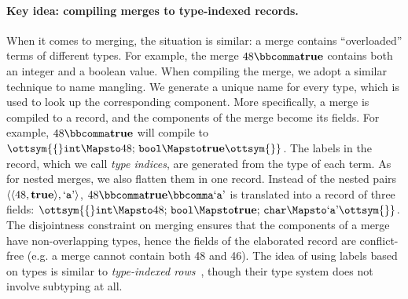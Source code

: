 \paragraph{Key idea: compiling merges to type-indexed records.}
When it comes to merging, the situation is similar: a merge contains
``overloaded'' terms of different types. For example, the merge $48  \bbcomma   \mathbf{true} $
contains both an integer and a boolean value. When compiling the merge, we adopt
a similar technique to name mangling. We generate a unique name for every type,
which is used to look up the corresponding component. More specifically, a merge
is compiled to a record, and the components of the merge become its fields. For
example, $48  \bbcomma   \mathbf{true} $ will compile to $\ottsym{\{}   \mathtt{int}   \Mapsto  48  ; \,   \mathtt{bool}   \Mapsto   \mathbf{true}   \ottsym{\}}$. The
labels in the record, which we call \emph{type indices}, are generated from the
type of each term. As for nested merges, we also flatten them in one record.
Instead of the nested pairs $ \langle   \langle  48 ,   \mathbf{true}   \rangle  ,   \text{`\texttt{a}'}   \rangle $, $48  \bbcomma   \mathbf{true}   \bbcomma   \text{`\texttt{a}'} $ is translated
into a record of three fields: $\ottsym{\{}   \mathtt{int}   \Mapsto  48  ; \,   \mathtt{bool}   \Mapsto   \mathbf{true}   ; \,   \mathtt{char}   \Mapsto   \text{`\texttt{a}'}   \ottsym{\}}$. The
disjointness constraint on merging ensures that the components of a merge have
non-overlapping types, hence the fields of the elaborated record are
conflict-free (e.g. a merge cannot contain both \textsf{48} and \textsf{46}).
The idea of using labels based on types is similar to \emph{type-indexed
rows}~\citep{shields2001type}, though their type system does not involve
subtyping at all.


